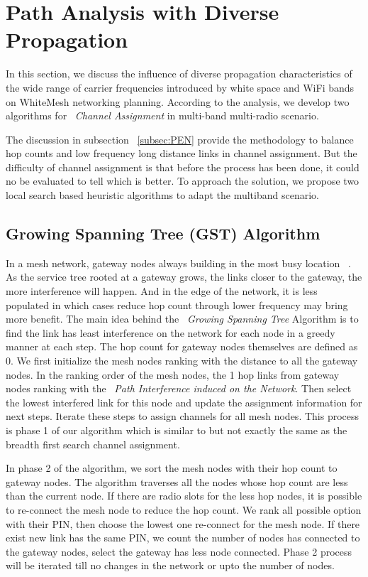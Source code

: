 \section{Path Analysis with Diverse Propagation}
\label{sec:wmalgorithms}


In this section, we discuss the influence of diverse propagation
characteristics of the wide range of carrier frequencies introduced
by white space and WiFi bands on WhiteMesh networking planning.
According to the analysis, we develop two algorithms for ~\emph{Channel Assignment} in multi-band multi-radio scenario.




The discussion in subsection ~\ref{subsec:PEN} provide the methodology to balance hop counts and low frequency long distance links in channel assignment. But the difficulty of channel assignment is that before the process has been done, it could no be evaluated to tell which is better.
To approach the solution, we propose two local search based heuristic algorithms to adapt the multiband scenario. 


\subsection{Growing Spanning Tree (GST) Algorithm}
In a mesh network, gateway nodes always building in the most busy location ~\cite{robinson2008adding, he2008optimizing}.
As the service tree rooted at a gateway grows, the links closer to the gateway, the more interference will happen.
And in the edge of the network, it is less populated in which cases reduce hop count through lower frequency may bring more benefit. 
The main idea behind the ~\emph{Growing Spanning Tree} Algorithm is 
to find the link has least interference on the network for each node in a greedy manner at each step. 
The hop count for gateway nodes themselves are defined as 0.
We first initialize the mesh nodes ranking with the distance to all the gateway nodes. 
In the ranking order of the mesh nodes, the 1 hop links from gateway nodes ranking with the ~\emph{Path Interference induced on the Network}. 
Then select the lowest interfered link for this node and update the assignment information for next steps. 
Iterate these steps to assign channels for all mesh nodes. 
This process is phase 1 of our algorithm which is similar to but not exactly the same as the breadth first search channel assignment. 

In phase 2 of the algorithm, we sort the mesh nodes with their hop count to gateway nodes. 
The algorithm traverses all the nodes whose hop count are less than the current node. 
If there are radio slots for the less hop nodes, it is possible to re-connect the mesh node to reduce the hop count. 
We rank all possible option with their PIN, then choose the lowest one re-connect for the mesh node. 
If there exist new link has the same PIN, we count the number of nodes has connected to the gateway nodes, select the gateway has less node connected. Phase 2 process will be iterated till no changes in the network or upto the number of nodes.

